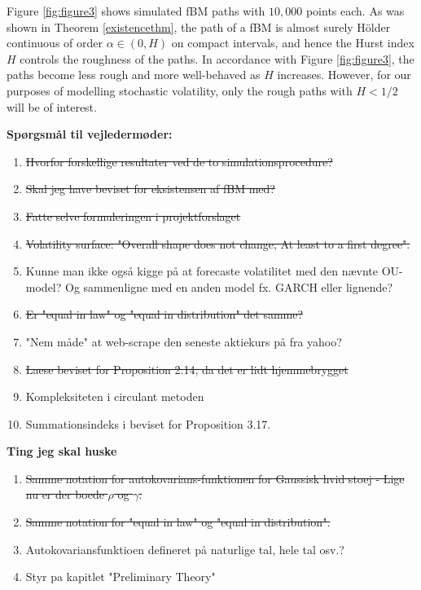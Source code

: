 Figure \ref{fig:figure3} shows simulated fBM paths with $10,000$ points each. As was shown in Theorem \ref{existencethm}, the path of a fBM is almost surely Hölder continuous of order $\alpha\in(0,H)$ on compact intervals, and hence the Hurst index $H$ controls the roughness of the paths. In accordance with Figure \ref{fig:figure3}, the paths become less rough and more well-behaved as $H$ increases. However, for our purposes of modelling stochastic volatility, only the rough paths with $H<1/2$ will be of interest.

\newpage
\textbf{Spørgsmål til vejledermøder:}
\begin{enumerate}
    \item \st{Hvorfor forskellige resultater ved de to simulationsprocedure?}
    \item \st{Skal jeg have beviset for eksistensen af fBM med?} 
    \item \st{Fatte selve formuleringen i projektforslaget} 
    \item \st{Volatility surface: "Overall shape does not change; At least to a first degree".}
    \item Kunne man ikke også kigge på at forecaste volatilitet med den nævnte OU-model? Og sammenligne med en anden model fx. GARCH eller lignende? 
    \item \st{Er "equal in law" og "equal in distribution" det samme?}
    \item "Nem måde" at web-scrape den seneste aktiekurs på fra yahoo?
    \item \st{Laese beviset for Proposition 2.14, da det er lidt hjemmebrygget}
    \item Kompleksiteten i circulant metoden
    \item Summationsindeks i beviset for Proposition 3.17.
\end{enumerate}
\textbf{Ting jeg skal huske}
\begin{enumerate}
    \item \st{Samme notation for autokovarians-funktionen for Gaussisk hvid stoej - Lige nu er der boede $\rho$ og $\gamma$.}
    \item \st{Samme notation for "equal in law" og "equal in distribution".}
    \item Autokovariansfunktioen defineret på naturlige tal, hele tal osv.?
    \item Styr pa kapitlet "Preliminary Theory"
\end{enumerate}